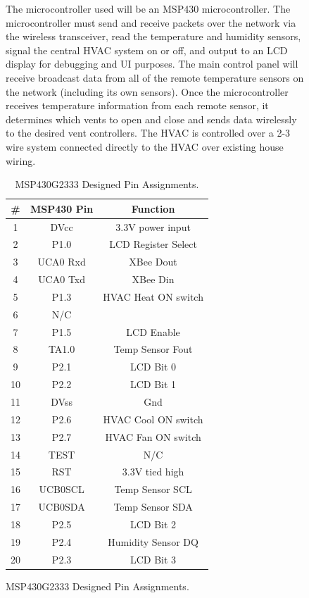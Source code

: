 \begin{figure}
The microcontroller used will be an MSP430 microcontroller. The microcontroller must send and receive packets over the network via the wireless transceiver, read the temperature and humidity sensors, signal the central HVAC system on or off, and output to an LCD display for debugging and UI purposes. The main control panel will receive broadcast data from all of the remote temperature sensors on the network (including its own sensors). Once the microcontroller receives temperature information from each remote sensor, it determines which vents to open and close and sends data wirelessly to the desired vent controllers. The HVAC is controlled over a 2-3 wire system connected directly to the HVAC over existing house wiring.
\begin{table}[htbp]
\centering
\caption{MSP430G2333 Designed Pin Assignments.}
\begin{tabular}{|c|c|c|}
\hline
\textbf{\#} & \textbf{MSP430 Pin} & \textbf{Function} \bigstrut\\
\hline
\hline
1 & DVcc & 3.3V power input \bigstrut\\
\hline
2 & P1.0 & LCD Register Select \bigstrut\\
\hline
3 & UCA0 Rxd & XBee Dout \bigstrut\\
\hline
4 & UCA0 Txd & XBee Din \bigstrut\\
\hline
5 & P1.3 & HVAC Heat ON switch \bigstrut\\
\hline
6 & N/C \bigstrut\\
\hline
7 & P1.5 & LCD Enable \bigstrut\\
\hline
8 & TA1.0 & Temp Sensor Fout \bigstrut\\
\hline
9 & P2.1 & LCD Bit 0 \bigstrut\\
\hline
10 & P2.2 & LCD Bit 1 \bigstrut\\
\hline
11 & DVss & Gnd \bigstrut\\
\hline
12 & P2.6 & HVAC Cool ON switch \bigstrut\\
\hline
13 & P2.7 & HVAC Fan ON switch \bigstrut\\
\hline
14 & TEST & N/C \bigstrut\\
\hline
15 & RST & 3.3V tied high \bigstrut\\
\hline
16 & UCB0SCL & Temp Sensor SCL \bigstrut\\
\hline
17 & UCB0SDA & Temp Sensor SDA \bigstrut\\
\hline
18 & P2.5 & LCD Bit 2 \bigstrut\\
\hline
19 & P2.4 & Humidity Sensor DQ \bigstrut\\
\hline
20 & P2.3 & LCD Bit 3 \bigstrut\\
\hline
\end{tabular}%
\label{tab:msp_inout}%
\end{table}%


\end{figure}
